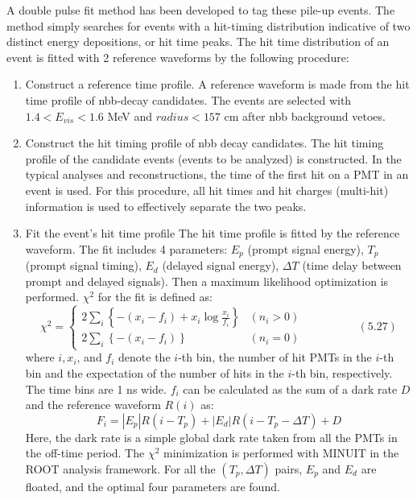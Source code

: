 A double pulse fit method has been developed to tag these pile-up events. The method simply searches for events with a hit-timing distribution indicative of two distinct energy depositions, or hit time peaks. The hit time distribution of an event is fitted with 2 reference waveforms by the following procedure:
\begin{enumerate}
	\item Construct a reference time profile.
	A reference waveform is made from the hit time profile of \2nbb-decay candidates. The events are selected with $1.4 < E_{vis}<1.6$ MeV and $radius < 157$ cm after \0nbb background vetoes. 
	\item Construct the hit timing profile of \0nbb decay candidates.
	The hit timing profile of the candidate events (events to be analyzed) is constructed. In the typical analyses and reconstructions, the time of the first hit on a PMT in an event is used. For this procedure, all hit times and hit charges (multi-hit) information is used to effectively separate the two peaks. 
	\item Fit the event's hit time profile
	The hit time profile is fitted by the reference waveform. The fit includes 4 parameters: $E_p$ (prompt signal energy), $T_p$ (prompt signal timing), $E_d$ (delayed signal energy), $\Delta T$ (time delay between prompt and delayed signals). Then a maximum likelihood optimization is performed. $\chi^2$ for the fit is defined as:
	\begin{equation}
		\chi^2 = 
		\begin{cases}
		2\sum_i \left\{ -(x_i-f_i) + x_i \log \frac{x_i}{f_i} \right\} & (n_i > 0) \\
		2\sum_i \left\{ -(x_i-f_i) \right\} & (n_i = 0)
		\end{cases}
		\hspace{2cm} (5.27)
	\end{equation}
	where $i, x_i$, and $f_i$ denote the $i$-th bin, the number of hit PMTs in the $i$-th bin and the expectation of the number of hits in the $i$-th bin, respectively. The time bins are 1 ns wide. $f_i$ can be calculated as the sum of a dark rate $D$ and the reference waveform $R(i)$ as:
	\begin{equation}
		F_i = |E_p|R(i-T_p)+|E_d|R(i-T_p-\Delta T) + D
	\end{equation}
	Here, the dark rate is a simple global dark rate taken from all the PMTs in the off-time period. The $\chi^2$ minimization is performed with MINUIT in the ROOT analysis framework. For all the $(T_p, \Delta T)$ pairs, $E_p$ and $E_d$ are floated, and the optimal four parameters are found.

\end{enumerate}
